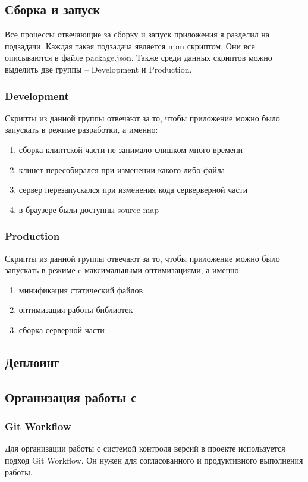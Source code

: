 \subsection{Сборка и запуск}
Все процессы отвечающие за сборку и запуск приложения я разделил на подзадачи. Каждая такая подзадача является npm скриптом. Они все описываются в файле package.json. Также среди данных скриптов можно выделить две группы -- Development и Production.

\subsubsection{Development}
Скрипты из данной группы отвечают за то, чтобы приложение можно было запускать в режиме разработки, а именно:
\begin{enumerate}
    \item сборка клинтской части не занимало слишком много времени
    \item клинет пересобирался при изменении какого-либо файла
    \item сервер перезапускался при изменения кода серверверной части
    \item в браузере были доступны source map
\end{enumerate}

\subsubsection{Production}
Скрипты из данной группы отвечают за то, чтобы приложение можно было запускать в режиме c максимальными оптимизациями, а именно:
\begin{enumerate}
    \item минификация статический файлов
    \item оптимизация работы библиотек
    \item сборка серверной части
\end{enumerate}

\subsection{Деплоинг}


\subsection{Организация работы с \textcite{git}}
\subsubsection{Git Workflow}
Для организации работы с системой контроля версий в проекте используется подход Git Workflow. Он нужен для согласованного и продуктивного выполнения работы.

